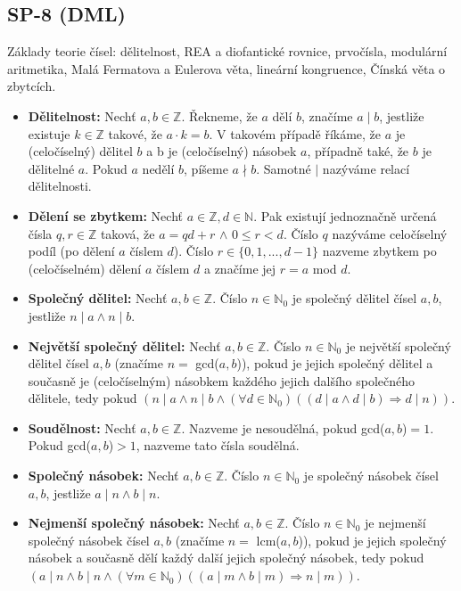 \subsection{SP-8 (DML)}
Základy teorie čísel: dělitelnost, REA a diofantické rovnice, prvočísla, modulární aritmetika, Malá Fermatova a Eulerova věta, lineární kongruence, Čínská věta o zbytcích.

\begin{itemize}
	\item \textbf{Dělitelnost:} Nechť  $a, b \in \mathbb{Z}$. Řekneme, že $a$ dělí $b$, značíme $a \mid b$, jestliže existuje $k \in \mathbb{Z}$ takové, že $a \cdot k = b$. V takovém případě říkáme, že $a$ je (celočíselný) dělitel $b$ a b je (celočíselný) násobek $a$, případně také, že $b$ je dělitelné $a$. Pokud $a$ nedělí $b$, píšeme $a \nmid b$. Samotné $\mid$ nazýváme relací dělitelnosti.
	
	\item \textbf{Dělení se zbytkem:} Nechť $a \in \mathbb{Z}, d \in \mathbb{N}$. Pak existují jednoznačně určená čísla $q, r \in \mathbb{Z}$ taková, že $a = qd + r$ $\land$ $0 \leq r < d$. Číslo $q$ nazýváme celočíselný podíl (po dělení $a$ číslem $d$). Číslo $r \in \{0,1,...,d-1\}$ nazveme zbytkem po (celočíselném) dělení $a$ číslem $d$ a značíme jej $r = a$ mod $d$.
	
	\item \textbf{Společný dělitel:} Nechť $a, b \in \mathbb{Z}$. Číslo $n \in \mathbb{N}_0$ je společný dělitel čísel $a, b$, jestliže $n \mid a \land n \mid b$.
	
	\item \textbf{Největší společný dělitel:} Nechť $a, b \in \mathbb{Z}$. Číslo $n \in \mathbb{N}_0$ je největší společný dělitel čísel $a, b$ (značíme $n =$ gcd($a, b$)), pokud je jejich společný dělitel a současně je (celočíselným) násobkem každého jejich dalšího společného dělitele, tedy pokud $(n \mid a \land n \mid b \land (\forall d \in \mathbb{N}_0)((d \mid a \land d \mid b) \Rightarrow d \mid n))$.
	
	\item \textbf{Soudělnost:} Nechť $a, b \in \mathbb{Z}$. Nazveme je nesoudělná, pokud gcd($a, b$)$ = 1$. Pokud gcd($a, b$)$ > 1$, nazveme tato čísla soudělná.
	
	\item \textbf{Společný násobek:} Nechť $a, b \in \mathbb{Z}$. Číslo $n \in \mathbb{N}_0$ je společný násobek čísel $a, b$, jestliže $a \mid n \land b \mid n$.
	
	\item \textbf{Nejmenší společný násobek:} Nechť $a, b \in \mathbb{Z}$. Číslo $n \in \mathbb{N}_0$ je nejmenší společný násobek čísel $a, b$ (značíme $n =$ lcm($a, b$)), pokud je jejich společný násobek a současně dělí každý další jejich společný násobek, tedy pokud $(a \mid n \land b \mid n \land (\forall m \in \mathbb{N}_0)((a \mid m \land b \mid m) \Rightarrow n \mid m))$.
	

\end{itemize}
